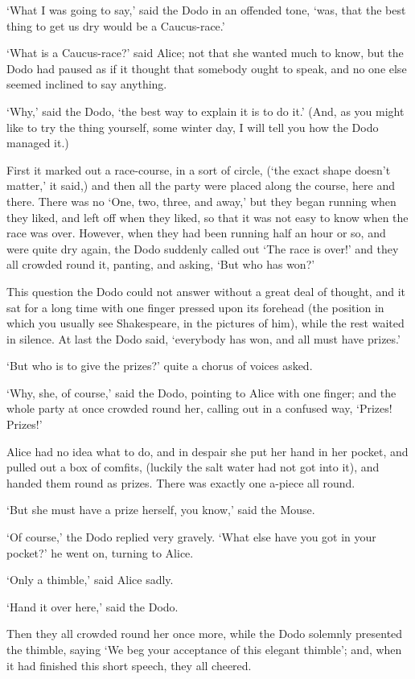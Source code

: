 \documentclass[statementpaper,twoside,openany]{memoir}
\begin{document}
`What I was going to say,' said the Dodo in an offended tone, `was, that the best thing to get us dry would be a Caucus-race.'

`What is a Caucus-race?' said Alice; not that she wanted much to know, but the Dodo had paused as if it thought that somebody ought to speak, and no one else seemed inclined to say anything.

`Why,' said the Dodo, `the best way to explain it is to do it.' (And, as you might like to try the thing yourself, some winter day, I will tell you how the Dodo managed it.)

First it marked out a race-course, in a sort of circle, (`the exact shape doesn't matter,' it said,) and then all the party were placed along the course, here and there. There was no `One, two, three, and away,' but they began running when they liked, and left off when they liked, so that it was not easy to know when the race was over. However, when they had been running half an hour or so, and were quite dry again, the Dodo suddenly called out `The race is over!' and they all crowded round it, panting, and asking, `But who has won?'

This question the Dodo could not answer without a great deal of thought, and it sat for a long time with one finger pressed upon its forehead (the position in which you usually see Shakespeare, in the pictures of him), while the rest waited in silence. At last the Dodo said, `everybody has won, and all must have prizes.'

`But who is to give the prizes?' quite a chorus of voices asked.

`Why, she, of course,' said the Dodo, pointing to Alice with one finger; and the whole party at once crowded round her, calling out in a confused way, `Prizes! Prizes!'

Alice had no idea what to do, and in despair she put her hand in her pocket, and pulled out a box of comfits, (luckily the salt water had not got into it), and handed them round as prizes. There was exactly one a-piece all round.

`But she must have a prize herself, you know,' said the Mouse.

`Of course,' the Dodo replied very gravely. `What else have you got in your pocket?' he went on, turning to Alice.

`Only a thimble,' said Alice sadly.

`Hand it over here,' said the Dodo.

Then they all crowded round her once more, while the Dodo solemnly presented the thimble, saying `We beg your acceptance of this elegant thimble'; and, when it had finished this short speech, they all cheered.
\end{document}
